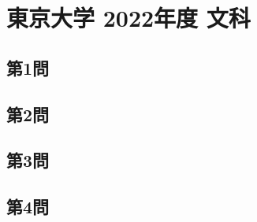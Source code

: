 ﻿\documentclass[../../uem_tok_q.tex]{subfiles}
\begin{document}
    \section{東京大学 2022年度 文科}

    \subsection{第1問}
    

    \vfill
    \subsection{第2問}
    

    \vfill
    \newpage
    \subsection{第3問}
    

    \vfill
    \subsection{第4問}
    

    \vfill
\end{document}
